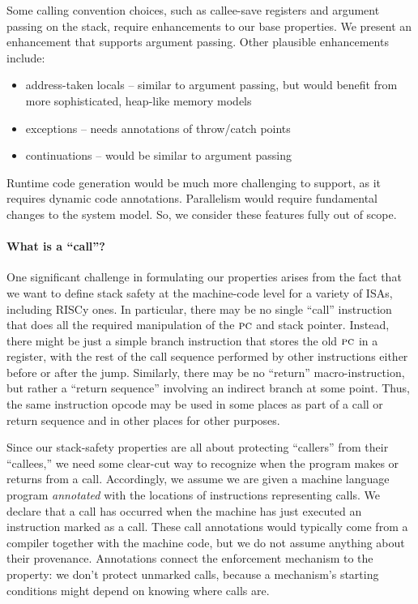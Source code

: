\documentclass[acmsmall,review,anonymous]{acmart}\settopmatter{printfolios=true,printccs=false,printacmref=false}
\begin{document}
Some calling convention choices, such as callee-save registers and argument
passing on the stack, require enhancements to our base properties. We present
an enhancement that supports argument passing. Other plausible enhancements
include:

\begin{itemize}
\item address-taken locals -- similar to argument passing, but
      would benefit from more sophisticated, heap-like memory models
\item exceptions -- needs annotations of throw/catch points
\item continuations -- would be similar to argument passing
\end{itemize}

Runtime code generation would be much more challenging to support, as
it requires dynamic code annotations. Parallelism would require
fundamental changes to the system model. So, we consider these features
fully out of scope.

\paragraph*{What is a ``call''?}  One significant challenge in formulating our
properties arises from the fact that we want to define stack safety at the
machine-code level for a variety of ISAs, including RISCy
\ifaftersubmission{}\fi ones.  In
particular, there may be no single ``call'' instruction that does all the
required manipulation of the \(\textsc{pc}\) and stack pointer. Instead, there
might be just a simple branch instruction that stores the old \(\textsc{pc}\) in
a register, with the rest of the call sequence performed by other
instructions either before or after the jump.  Similarly, there may be no
``return'' macro-instruction, but rather a ``return sequence'' involving an
indirect branch at some point.  Thus, the same instruction opcode may be
used in some places as part of a call or return sequence and in other places
for other purposes.

Since our stack-safety properties are all about protecting ``callers'' from
their ``callees,'' we need some clear-cut way to recognize when the program
makes or returns from a call.  Accordingly, we assume we are given a machine
language program {\em annotated} with the locations of instructions
representing calls.  We declare that a call has occurred when the machine
has just executed an instruction marked as a call.
%
These call annotations would typically come from a compiler together with
the machine code, but we do not assume anything about their provenance.
Annotations connect the enforcement mechanism to the property: we don't
protect unmarked calls, because a mechanism's starting conditions might
depend on knowing where calls are.
\end{document}
